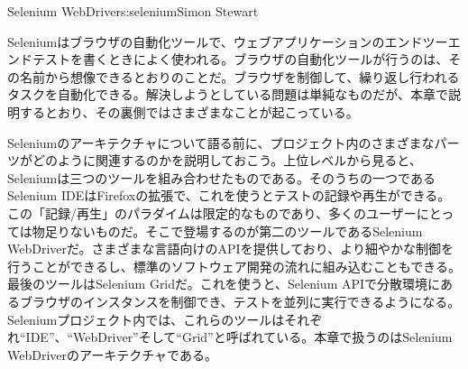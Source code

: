 \begin{aosachapter}{Selenium WebDriver}{s:selenium}{Simon Stewart}

Seleniumはブラウザの自動化ツールで、ウェブアプリケーションのエンドツーエンドテストを書くときによく使われる。ブラウザの自動化ツールが行うのは、その名前から想像できるとおりのことだ。ブラウザを制御して、繰り返し行われるタスクを自動化できる。解決しようとしている問題は単純なものだが、本章で説明するとおり、その裏側ではさまざまなことが起こっている。

Seleniumのアーキテクチャについて語る前に、プロジェクト内のさまざまなパーツがどのように関連するのかを説明しておこう。上位レベルから見ると、Seleniumは三つのツールを組み合わせたものである。そのうちの一つであるSelenium IDEはFirefoxの拡張で、これを使うとテストの記録や再生ができる。この「記録/再生」のパラダイムは限定的なものであり、多くのユーザーにとっては物足りないものだ。そこで登場するのが第二のツールであるSelenium WebDriverだ。さまざまな言語向けのAPIを提供しており、より細やかな制御を行うことができるし、標準のソフトウェア開発の流れに組み込むこともできる。最後のツールはSelenium Gridだ。これを使うと、Selenium APIで分散環境にあるブラウザのインスタンスを制御でき、テストを並列に実行できるようになる。Seleniumプロジェクト内では、これらのツールはそれぞれ``IDE''、``WebDriver''そして``Grid''と呼ばれている。本章で扱うのはSelenium WebDriverのアーキテクチャである。


\end{aosachapter}
